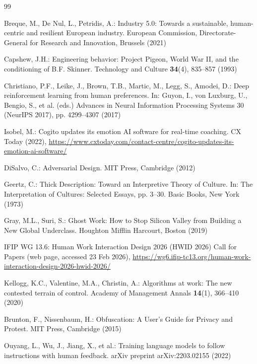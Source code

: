 \documentclass[runningheads]{llncs}
\begin{document}
\begin{thebibliography}{99}

Breque, M., De Nul, L., Petridis, A.: Industry 5.0: Towards a sustainable, human-centric and resilient European industry. European Commission, Directorate-General for Research and Innovation, Brussels (2021)

Capshew, J.H.: Engineering behavior: Project Pigeon, World War II, and the conditioning of B.F. Skinner. Technology and Culture \textbf{34}(4), 835--857 (1993)

Christiano, P.F., Leike, J., Brown, T.B., Martic, M., Legg, S., Amodei, D.: Deep reinforcement learning from human preferences. In: Guyon, I., von Luxburg, U., Bengio, S., et al. (eds.) Advances in Neural Information Processing Systems 30 (NeurIPS 2017), pp. 4299--4307 (2017)

Isobel, M.: Cogito updates its emotion AI software for real-time coaching. CX Today (2022), \url{https://www.cxtoday.com/contact-centre/cogito-updates-its-emotion-ai-software/}

DiSalvo, C.: Adversarial Design. MIT Press, Cambridge (2012)

Geertz, C.: Thick Description: Toward an Interpretive Theory of Culture. In: The Interpretation of Cultures: Selected Essays, pp. 3--30. Basic Books, New York (1973)

Gray, M.L., Suri, S.: Ghost Work: How to Stop Silicon Valley from Building a New Global Underclass. Houghton Mifflin Harcourt, Boston (2019)

IFIP WG 13.6: Human Work Interaction Design 2026 (HWID 2026) Call for Papers (web page, accessed 23 Feb 2026), \url{https://wg6.ifip-tc13.org/human-work-interaction-design-2026-hwid-2026/}

Kellogg, K.C., Valentine, M.A., Christin, A.: Algorithms at work: The new contested terrain of control. Academy of Management Annals \textbf{14}(1), 366--410 (2020)

Brunton, F., Nissenbaum, H.: Obfuscation: A User's Guide for Privacy and Protest. MIT Press, Cambridge (2015)

Ouyang, L., Wu, J., Jiang, X., et al.: Training language models to follow instructions with human feedback. arXiv preprint arXiv:2203.02155 (2022)


\end{thebibliography}
\end{document}

